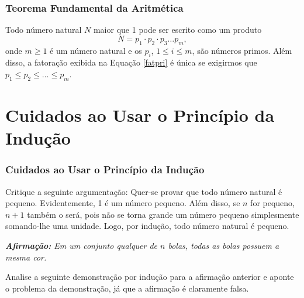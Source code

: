 \documentclass[brazil, notheorems, 10pt]{beamer}
\begin{document}

\begin{frame}
\frametitle{Teorema Fundamental da Aritmética} %

\begin{Teo}
Todo número natural $N$ maior que 1 pode ser escrito como um produto
\begin{equation}\label{fatpri}
N = p_1 \cdot p_2 \cdot p_3 \dots p_m,
\end{equation}
onde $m \geq 1$ é um número natural e os $p_i$, $1 \leq i \leq m$,
são números primos. Além disso, a fatoração exibida na Equação \ref{fatpri} é única
se exigirmos que $p_1 \leq p_2 \leq \dots \leq p_m$.

\end{Teo}

\end{frame}



\section{Cuidados ao Usar o Princípio da Indução}
\begin{frame}
\frametitle{Cuidados ao Usar o Princípio da Indução} %

\begin{Exem}
Critique a seguinte argumentação: Quer-se provar que todo número
natural é pequeno. Evidentemente, 1 é um número pequeno. Além disso,
se $n$ for pequeno, $n+1$ também o será, pois não se torna grande um
número pequeno simplesmente somando-lhe uma unidade. Logo, por
indução, todo número natural é pequeno.
\end{Exem} \pause

\begin{Exem}
\emph{\textbf{Afirmação:} Em um conjunto qualquer de $n$ bolas,
todas as bolas possuem a mesma cor.}

Analise a seguinte demonstração por indução para a afirmação
anterior e aponte o problema da demonstração, já que a afirmação é
claramente falsa.
\end{Exem}
\end{frame}



\end{document}
